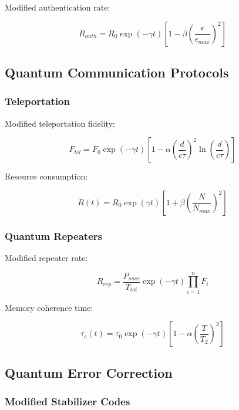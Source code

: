 \documentclass[12pt]{article}
\theoremstyle{plain}
\theoremstyle{definition}
\theoremstyle{remark}
\begin{document}
Modified authentication rate:

\begin{equation}
R_{auth} = R_0\exp(-\gamma t)\left[1 - \beta\left(\frac{\epsilon}{\epsilon_{max}}\right)^2\right]
\end{equation}

\subsection{Quantum Communication Protocols}

\subsubsection{Teleportation}

Modified teleportation fidelity:

\begin{equation}
F_{tel} = F_0\exp(-\gamma t)\left[1 - \alpha\left(\frac{d}{c\tau}\right)^2\ln\left(\frac{d}{c\tau}\right)\right]
\end{equation}

Resource consumption:

\begin{equation}
R(t) = R_0\exp(\gamma t)\left[1 + \beta\left(\frac{N}{N_{max}}\right)^2\right]
\end{equation}

\subsubsection{Quantum Repeaters}

Modified repeater rate:

\begin{equation}
R_{rep} = \frac{P_{succ}}{T_{tot}}\exp(-\gamma t)\prod_{i=1}^n F_i
\end{equation}

Memory coherence time:

\begin{equation}
\tau_c(t) = \tau_0\exp(-\gamma t)\left[1 - \alpha\left(\frac{T}{T_2}\right)^2\right]
\end{equation}

\subsection{Quantum Error Correction}

\subsubsection{Modified Stabilizer Codes}
\end{document}
